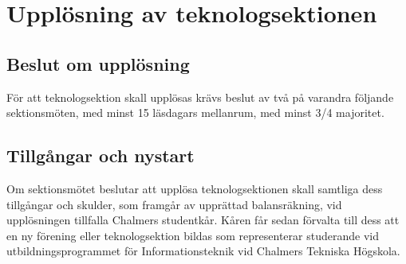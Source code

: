\section{Upplösning av teknologsektionen}

\subsection{Beslut om upplösning}

För att teknologsektion skall upplösas krävs beslut av två på varandra följande sektionsmöten, med minst 15 läsdagars mellanrum, med minst 3/4 majoritet.


\subsection{Tillgångar och nystart}

Om sektionsmötet beslutar att upplösa teknologsektionen skall samtliga dess tillgångar och skulder, som framgår av upprättad balansräkning, vid upplösningen tillfalla Chalmers studentkår. Kåren får sedan förvalta till dess att en ny förening eller teknologsektion bildas som representerar studerande vid utbildningsprogrammet för Informationsteknik vid Chalmers Tekniska Högskola.